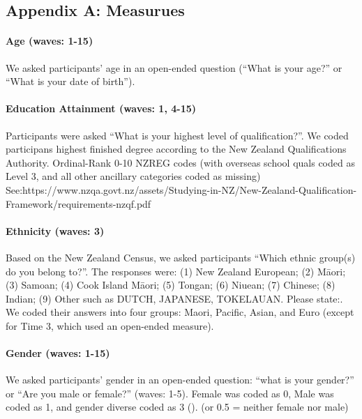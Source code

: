\documentclass[
  singlecolumn]{article}
\let\oldparagraph\paragraph
\renewcommand{\paragraph}[1]{\oldparagraph{#1}\mbox{}}
\begin{document}
\newpage{}

\subsection{Appendix A: Measurues}\label{appendix-measures}

\paragraph{Age (waves: 1-15)}\label{age-waves-1-15}

We asked participants' age in an open-ended question (``What is your
age?'' or ``What is your date of birth'').

\paragraph{Education Attainment (waves: 1,
4-15)}\label{education-attainment-waves-1-4-15}

Participants were asked ``What is your highest level of
qualification?''. We coded participans highest finished degree according
to the New Zealand Qualifications Authority. Ordinal-Rank 0-10 NZREG
codes (with overseas school quals coded as Level 3, and all other
ancillary categories coded as missing)
See:https://www.nzqa.govt.nz/assets/Studying-in-NZ/New-Zealand-Qualification-Framework/requirements-nzqf.pdf

\paragraph{Ethnicity (waves: 3)}\label{ethnicity-waves-3}

Based on the New Zealand Census, we asked participants ``Which ethnic
group(s) do you belong to?''. The responses were: (1) New Zealand
European; (2) Māori; (3) Samoan; (4) Cook Island Māori; (5) Tongan; (6)
Niuean; (7) Chinese; (8) Indian; (9) Other such as DUTCH, JAPANESE,
TOKELAUAN. Please state:. We coded their answers into four groups:
Maori, Pacific, Asian, and Euro (except for Time 3, which used an
open-ended measure).

\paragraph{Gender (waves: 1-15)}\label{gender-waves-1-15}

We asked participants' gender in an open-ended question: ``what is your
gender?'' or ``Are you male or female?'' (waves: 1-5). Female was coded
as 0, Male was coded as 1, and gender diverse coded as 3
(). (or 0.5
= neither female nor male)
\end{document}
